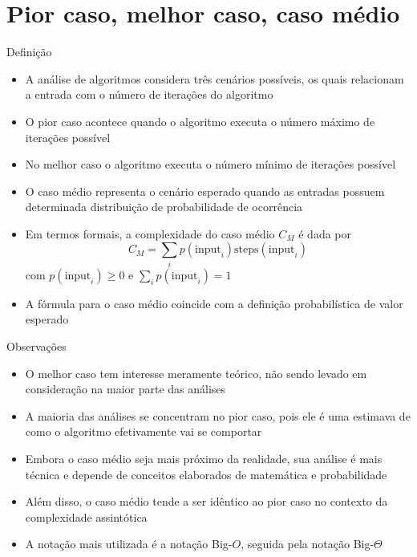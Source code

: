 \section{Pior caso, melhor caso, caso médio}

\begin{frame}[fragile]{Definição}

	\begin{itemize}
        \item A análise de algoritmos considera três cenários possíveis, os quais relacionam
        a entrada com o número de iterações do algoritmo

		\item O pior caso acontece quando o algoritmo executa o número máximo de iterações possível

		\item No melhor caso o algoritmo executa o número mínimo de iterações possível

		\item O caso médio representa o cenário esperado quando as entradas possuem determinada
        distribuição de probabilidade de ocorrência

		\item Em termos formais, a complexidade do caso médio $C_M$ é dada por
		\[
		C_M = \sum_i p(\mbox{input}_i)\mbox{steps}(\mbox{input}_i)
		\] 
        com $p(\mbox{input}_i) \geq 0$ e $\sum_i p(\mbox{input}_i) = 1$

		\item A fórmula para o caso médio coincide com a definição probabilística de
		valor esperado

	\end{itemize}

\end{frame}

\begin{frame}[fragile]{Observações}

    \begin{itemize}
        \item O melhor caso tem interesse meramente teórico, não sendo levado em
        consideração na maior parte das análises

        \item A maioria das análises se concentram no pior caso, pois ele é uma estimava
        de como o algoritmo efetivamente vai se comportar
    
        \item Embora o caso médio seja mais próximo da realidade, sua análise é mais técnica
        e depende de conceitos elaborados de matemática e probabilidade

        \item Além disso, o caso médio tende a ser idêntico ao pior caso no contexto da
        complexidade assintótica

        \item A notação mais utilizada é a notação Big-$O$, seguida pela notação
        Big-$\Theta$
    \end{itemize}

\end{frame}
